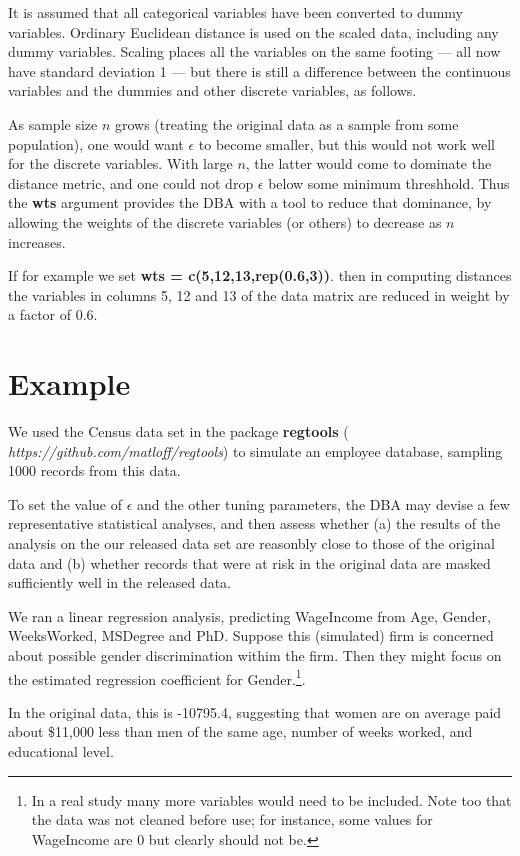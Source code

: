 \documentclass[11pt]{article}
\begin{document}
It is assumed that all categorical variables have been converted to
dummy variables.  Ordinary Euclidean distance is used on the scaled
data, including any dummy variables.  Scaling places all the variables
on the same footing --- all now have standard deviation 1 --- but there
is still a difference between the continuous variables and the dummies
and other discrete variables, as follows.

As sample size $n$ grows (treating the original data as a sample from
some population), one would want $\epsilon$ to become smaller, but this
would not work well for the discrete variables.  With large $n$, the
latter would come to dominate the distance metric, and one could not
drop $\epsilon$ below some minimum threshhold.  Thus the {\bf wts}
argument provides the DBA with a tool to reduce that dominance, by
allowing the weights of the discrete variables (or others) to decrease
as $n$ increases.

If for example we set {\bf wts = c(5,12,13,rep(0.6,3))}. then in
computing distances the variables in columns 5, 12 and 13 of the data
matrix are reduced in weight by a factor of 0.6.  

\section{Example}

We used the Census data set in the package {\bf regtools} ({\it
https://github.com/matloff/regtools}) to simulate an employee
database, sampling 1000 records from this data.

To set the value of $\epsilon$ and the other tuning parameters, the DBA
may devise a few representative statistical analyses, and then assess
whether (a) the results of the analysis on the our released data set are
reasonbly close to those of the original data and (b) whether records
that were at risk in the original data are masked sufficiently well in
the released data.
 
We ran a linear regression analysis, predicting WageIncome from Age,
Gender, WeeksWorked, MSDegree and PhD.  Suppose this (simulated) firm is
concerned about possible gender discrimination withim the firm. Then
they might focus on the estimated regression coefficient for
Gender.\footnote{In a real study many more variables would
need to be included.  Note too that the data was not cleaned before use;
for instance, some values for WageIncome are 0 but
clearly should not be.}.


In the original data, this is -10795.4, suggesting that women are on
average paid about \$11,000 less than men of the same age, number of
weeks worked, and educational level. 
\end{document}
